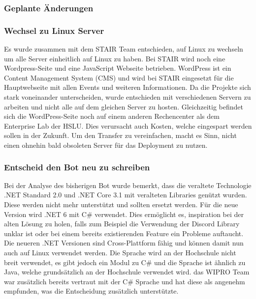 \documentclass[a4paper, table]{article}
\begin{document}
\subsubsection{Geplante Änderungen}\label{geplanteAenderungen}

\subsubsection*{Wechsel zu Linux Server}

Es wurde zusammen mit dem STAIR Team entschieden,
auf Linux zu wechseln um alle Server einheitlich auf Linux zu haben.
Bei STAIR wird noch eine Wordpress-Seite und eine JavaScript Webseite betrieben.
WordPress ist ein Content Management System (CMS) und wird bei STAIR eingesetzt für die Hauptwebseite mit allen Events und weiteren Informationen.
Da die Projekte sich stark voneinander unterscheiden, wurde entschieden mit verschiedenen Servern zu arbeiten und nicht alle auf dem gleichen Server zu hosten.
Gleichzeitig befindet sich die WordPress-Seite noch auf einem anderen Rechencenter als dem Enterprise Lab der HSLU.
Dies verursacht auch Kosten, welche eingespart werden sollen in der Zukunft.
Um den Transfer zu vereinfachen, macht es Sinn, nicht einen ohnehin bald obsoleten Server für das Deployment zu nutzen.

\subsubsection*{Entscheid den Bot neu zu schreiben}

Bei der Analyse des bisherigen Bot wurde bemerkt, dass die veraltete Technologie .NET Standard 2.0 und .NET Core 3.1 mit veralteten Libraries genützt wurden.
Diese werden nicht mehr unterstützt und sollten ersetzt werden.
Für die neue Version wird .NET 6 mit C\# verwendet.
Dies ermöglicht es, inspiration bei der alten Lösung zu holen, falls zum Beispiel die Verwendung der Discord Library unklar ist oder bei einem bereits existierenden Feature ein Probleme auftaucht.
Die neueren .NET Versionen sind Cross-Plattform fähig und können damit nun auch auf Linux verwendet werden.\autocite{de_george_installieren_nodate}
Die Sprache wird an der Hochschule nicht breit verwendet, es gibt jedoch ein Modul zu C\#\autocite{}  und die Sprache ist ähnlich zu Java,
welche grundsätzlich an der Hochschule verwendet wird.
das WIPRO Team war zusätzlich bereits vertraut mit der C\# Sprache und hat diese als angenehm empfunden, was die Entscheidung zusätzlich unterstützte.
\end{document}
